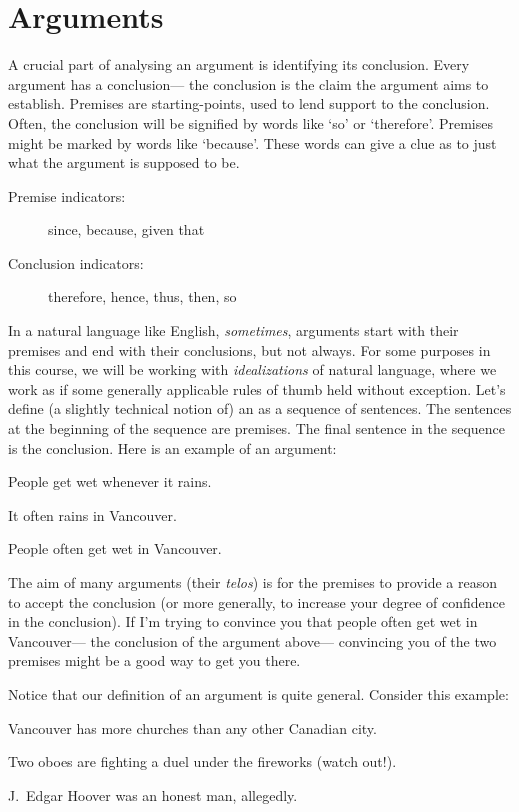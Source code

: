 \section{Arguments}

A crucial part of analysing an argument is identifying its conclusion.
Every argument has a conclusion--- the conclusion is the claim the argument aims to establish.
Premises are starting-points, used to lend support to the conclusion.
Often, the conclusion will be signified by words like `so' or `therefore'.
Premises might be marked by words like `because'.
These words can give a clue as to just what the argument is supposed to be.

\begin{description}
  \item[Premise indicators:] since, because, given that
  \item[Conclusion indicators:] therefore, hence, thus, then, so
\end{description}

In a natural language like English, \emph{sometimes}, arguments start with their premises and end with their conclusions, but not always.
For some purposes in this course, we will be working with \emph{idealizations} of natural language, where we work as if some generally applicable rules of thumb held without exception.
Let's define (a slightly technical notion of) an  as a sequence of sentences.
The sentences at the beginning of the sequence are premises.
The final sentence in the sequence is the conclusion.
Here is an example of an argument:

\begin{earg}
  \item[] People get wet whenever it rains.
  \item[] It often rains in Vancouver.
  \item[\therefore] People often get wet in Vancouver.
\end{earg}

The aim of many arguments (their \textit{telos}) is for the premises to provide a reason to accept the conclusion (or more generally, to increase your degree of confidence in the conclusion).
If I'm trying to convince you that people often get wet in Vancouver--- the conclusion of the argument above--- convincing you of the two premises might be a good way to get you there.

Notice that our definition of an argument is quite general. Consider this example:
\begin{earg}
  \item[] Vancouver has more churches than any other Canadian city.
  \item[] Two oboes are fighting a duel under the fireworks (watch out!).
  \item[\therefore] J.\ Edgar Hoover was an honest man, allegedly.
\end{earg}


